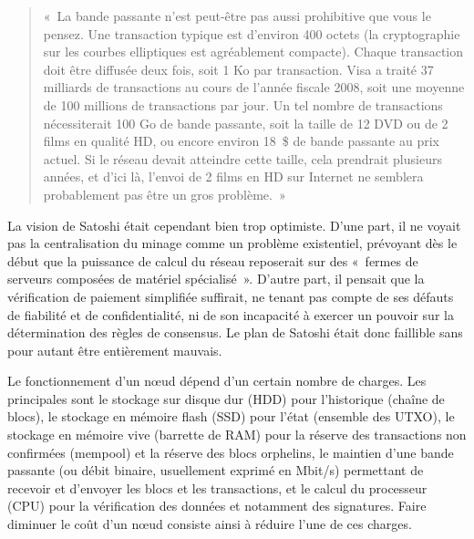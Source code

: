 \begin{quote}
«~La bande passante n'est peut-être pas aussi prohibitive que vous le pensez. Une transaction typique est d'environ 400 octets (la cryptographie sur les courbes elliptiques est agréablement compacte). Chaque transaction doit être diffusée deux fois, soit 1 Ko par transaction. Visa a traité 37 milliards de transactions au cours de l'année fiscale 2008, soit une moyenne de 100 millions de transactions par jour. Un tel nombre de transactions nécessiterait 100 Go de bande passante, soit la taille de 12 DVD ou de 2 films en qualité HD, ou encore environ 18~\$ de bande passante au prix actuel. Si le réseau devait atteindre cette taille, cela prendrait plusieurs années, et d'ici là, l'envoi de 2 films en HD sur Internet ne semblera probablement pas être un gros problème.~»
\end{quote} %

La vision de Satoshi était cependant bien trop optimiste. D'une part, il ne voyait pas la centralisation du minage comme un problème existentiel, prévoyant dès le début que la puissance de calcul du réseau reposerait sur des «~fermes de serveurs composées de matériel spécialisé~». D'autre part, il pensait que la vérification de paiement simplifiée suffirait, ne tenant pas compte de ses défauts de fiabilité et de confidentialité, ni de son incapacité à exercer un pouvoir sur la détermination des règles de consensus. Le plan de Satoshi était donc faillible sans pour autant être entièrement mauvais.

Le fonctionnement d'un nœud dépend d'un certain nombre de charges. Les principales sont le stockage sur disque dur (HDD) pour l'historique (chaîne de blocs), le stockage en mémoire flash (SSD) pour l'état (ensemble des UTXO), le stockage en mémoire vive (barrette de RAM) pour la réserve des transactions non confirmées (mempool) et la réserve des blocs orphelins, le maintien d'une bande passante (ou débit binaire, usuellement exprimé en Mbit/s) permettant de recevoir et d'envoyer les blocs et les transactions, et le calcul du processeur (CPU) pour la vérification des données et notamment des signatures. Faire diminuer le coût d'un nœud consiste ainsi à réduire l'une de ces charges.


